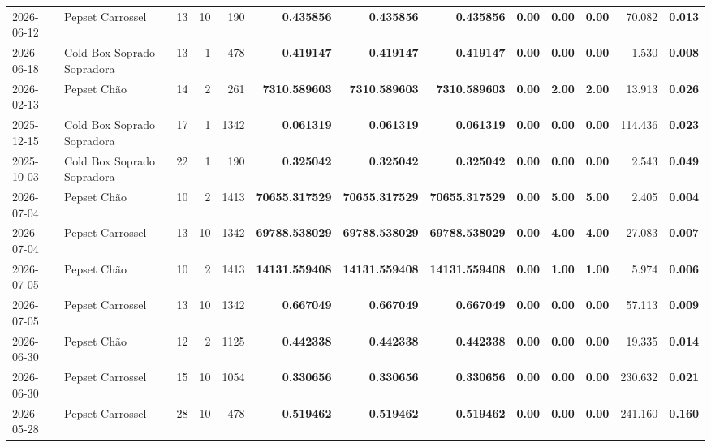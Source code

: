 {\begin{center}
{\begin{tabular}{@{}llrrrrrrrrrrr@{}}
2026-06-12 & Pepset Carrossel & 13 & 10 & 190 & \textbf{0.435856} & \textbf{0.435856} & \textbf{0.435856} & \textbf{0.00} & \textbf{0.00} & \textbf{0.00} & 70.082 & \textbf{0.013} \\
2026-06-18 & Cold Box Soprado Sopradora & 13 & 1 & 478 & \textbf{0.419147} & \textbf{0.419147} & \textbf{0.419147} & \textbf{0.00} & \textbf{0.00} & \textbf{0.00} & 1.530 & \textbf{0.008} \\
2026-02-13 & Pepset Chão & 14 & 2 & 261 & \textbf{7310.589603} & \textbf{7310.589603} & \textbf{7310.589603} & \textbf{0.00} & \textbf{2.00} & \textbf{2.00} & 13.913 & \textbf{0.026} \\
2025-12-15 & Cold Box Soprado Sopradora & 17 & 1 & 1342 & \textbf{0.061319} & \textbf{0.061319} & \textbf{0.061319} & \textbf{0.00} & \textbf{0.00} & \textbf{0.00} & 114.436 & \textbf{0.023} \\
2025-10-03 & Cold Box Soprado Sopradora & 22 & 1 & 190 & \textbf{0.325042} & \textbf{0.325042} & \textbf{0.325042} & \textbf{0.00} & \textbf{0.00} & \textbf{0.00} & 2.543 & \textbf{0.049} \\
2026-07-04 & Pepset Chão & 10 & 2 & 1413 & \textbf{70655.317529} & \textbf{70655.317529} & \textbf{70655.317529} & \textbf{0.00} & \textbf{5.00} & \textbf{5.00} & 2.405 & \textbf{0.004} \\
2026-07-04 & Pepset Carrossel & 13 & 10 & 1342 & \textbf{69788.538029} & \textbf{69788.538029} & \textbf{69788.538029} & \textbf{0.00} & \textbf{4.00} & \textbf{4.00} & 27.083 & \textbf{0.007} \\
2026-07-05 & Pepset Chão & 10 & 2 & 1413 & \textbf{14131.559408} & \textbf{14131.559408} & \textbf{14131.559408} & \textbf{0.00} & \textbf{1.00} & \textbf{1.00} & 5.974 & \textbf{0.006} \\
2026-07-05 & Pepset Carrossel & 13 & 10 & 1342 & \textbf{0.667049} & \textbf{0.667049} & \textbf{0.667049} & \textbf{0.00} & \textbf{0.00} & \textbf{0.00} & 57.113 & \textbf{0.009} \\
2026-06-30 & Pepset Chão & 12 & 2 & 1125 & \textbf{0.442338} & \textbf{0.442338} & \textbf{0.442338} & \textbf{0.00} & \textbf{0.00} & \textbf{0.00} & 19.335 & \textbf{0.014} \\
2026-06-30 & Pepset Carrossel & 15 & 10 & 1054 & \textbf{0.330656} & \textbf{0.330656} & \textbf{0.330656} & \textbf{0.00} & \textbf{0.00} & \textbf{0.00} & 230.632 & \textbf{0.021} \\
2026-05-28 & Pepset Carrossel & 28 & 10 & 478 & \textbf{0.519462} & \textbf{0.519462} & \textbf{0.519462} & \textbf{0.00} & \textbf{0.00} & \textbf{0.00} & 241.160 & \textbf{0.160} \\

\end{tabular}}
\end{center}}
